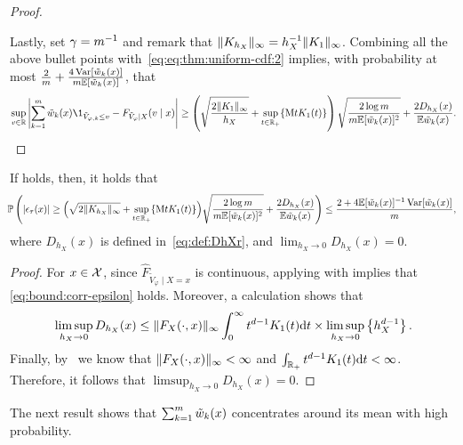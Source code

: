 \begin{proof}
\begin{itemize}
  \end{itemize}
  Lastly, set $\gamma=m^{-1}$ and remark that $\|{K_{h_{X}}}\|_{\infty} = h_{X}^{-1} \|{K_{1}}\|_{\infty}$.
  Combining all the above bullet points with~\eqref{eq:eq:thm:uniform-cdf:2} implies, with probability at most $\frac{2}{m}+\frac{4 \operatorname{Var}[\tilde{w}_k(x)]}{m \mathbb{E}[\tilde{w}_k(x)]}$, that
  \begin{equation*}
    \sup_{v\in\R} \abs{\sum_{k=1}^{\ccount} \tilde{w}_{k}(x) \1_{\tilde{V}_{\varphi,k}\le v} - F_{\tilde{V}_{\varphi}\mid X}(v\mid x)}
    \ge \pr{ \sqrt{\frac{2\normn{K_{1}}_{\infty}}{ h_{X} }} + \sup_{t\in\R_+}\acn{\mathrm{M} t K_{1}(t)}} \sqrt{\frac{ 2 \log \ccount }{ \ccount \E[\tilde{w}_k(x)]^2 }}
    + \frac{2 D_{h_X}(x)}{\E \tilde{w}_k(x)}
    .
  \end{equation*}
\end{proof}

\begin{corollary}
  If  holds, then, it holds that
  \begin{equation}
  \label{eq:bound:corr-epsilon}
    \!\! \mathbb{P}\left({ \left\lvert{\epsilon_{\tau}(x)}\right\rvert
    \ge \Big({ \sqrt{2\|{K_{h_{X}}}\|_{\infty}} + \sup_{t\in\mathbb{R}_+}\{{\mathrm{M} t K_{1}(t)}\}}\Big) \sqrt{\frac{ 2 \log m }{ m \mathbb{E}[\tilde{w}_k(x)]^2 }}
    + \frac{2 D_{h_X}(x) }{\mathbb{E} \tilde{w}_k(x)}
    }\right)
    \le \frac{2 + 4 \mathbb{E}[\tilde{w}_k(x)]^{-1} \operatorname{Var}[\tilde{w}_k(x)]}{m}
    ,
  \end{equation}
  where $D_{h_X}(x)$ is defined in~\eqref{eq:def:DhXr}, and $\lim_{h_X\to 0} D_{h_X}(x)=0$.
\end{corollary}

\begin{proof}
  For $x\in\mathcal{X}$, since $\hat{F}_{\tilde{V}_{\varphi}\mid X=x}$ is continuous, applying  with  implies that \eqref{eq:bound:corr-epsilon} holds.
  Moreover, a calculation shows that 
  \begin{equation*}
    \limsup_{h_X\to 0} D_{h_X}(x)
    \le \|{F_{X}(\cdot,x)}\|_{\infty} \int_{0}^{\infty} t^{d-1} K_{1}(t) \mathrm{d} t \times \limsup_{h_X\to 0} \left\{{ h_{X}^{d-1} }\right\}.
  \end{equation*}
  Finally, by~ we know that $\|{F_{X}(\cdot,x)}\|_{\infty} < \infty$ and $\int_{\mathbb{R}_+} t^{d-1} K_1(t)\mathrm{d} t<\infty$. Therefore, it follows that $\limsup_{h_X\to 0} D_{h_X}(x)=0$.
\end{proof}

The next result shows that $\sum_{k=1}^{m} \tilde{w}_{k}(x)$ concentrates around its mean with high probability.

